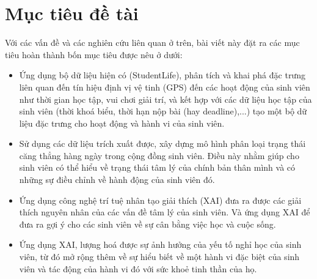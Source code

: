 \section{Mục tiêu đề tài}
Với các vấn đề và các nghiên cứu liên quan ở trên, bài viết này đặt ra các mục tiêu hoàn thành bốn mục tiêu được nêu ở dưới:
\begin{itemize}
    \item Ứng dụng bộ dữ liệu hiện có (StudentLife), phân tích và khai phá đặc trưng liên quan đến tín hiệu định vị vệ tinh (GPS) đến các hoạt động của sinh viên như thời gian học tập, vui chơi giải trí, và kết hợp với các dữ liệu học tập của sinh viên (thời khoá biểu, thời hạn nộp bài (hay deadline),...) tạo một bộ dữ liệu đặc trưng cho hoạt động và hành vi của sinh viên.
    \item Sử dụng các dữ liệu trích xuất được, xây dựng mô hình phân loại trạng thái căng thẳng hàng ngày trong cộng đồng sinh viên. Điều này nhằm giúp cho sinh viên có thể hiểu về trạng thái tâm lý của chính bản thân mình và có những sự điều chỉnh về hành động của sinh viên đó.
    \item Ứng dụng công nghệ trí tuệ nhân tạo giải thích (XAI) đưa ra được các giải thích nguyên nhân của các vấn đề tâm lý của sinh viên. Và ứng dụng XAI để đưa ra gợi ý cho các sinh viên về sự cân bằng việc học và cuộc sống.
    \item Ứng dụng XAI, lượng hoá được sự ảnh hưởng của yếu tố nghỉ học của sinh viên, từ đó mở rộng thêm về sự hiểu biết về  một hành vi đặc biệt của sinh viên và tác động của hành vi đó với sức khoẻ tinh thần của họ.
\end{itemize}